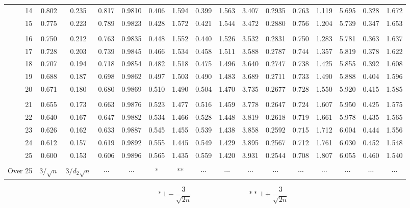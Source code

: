\documentclass{article}
\begin{document}
\begin{center}
\begin{tabular}{|r|c|c|c|c|c|c|c|c|c|c|c|c|c|c|c|}
    14 & 0.802 & 0.235 & 0.817 & 0.9810 & 0.406 & 1.594 & 0.399 & 1.563
       & 3.407 & 0.2935 & 0.763 & 1.119 & 5.695 & 0.328 & 1.672 \\
    15 & 0.775 & 0.223 & 0.789 & 0.9823 & 0.428 & 1.572 & 0.421 & 1.544
       & 3.472 & 0.2880 & 0.756 & 1.204 & 5.739 & 0.347 & 1.653 \\
       &       &        &       &       &       &       &       &
       &       &        &       &       &       &       &       \\
    16 & 0.750 & 0.212 & 0.763 & 0.9835 & 0.448 & 1.552 & 0.440 & 1.526
       & 3.532 & 0.2831 & 0.750 & 1.283 & 5.781 & 0.363 & 1.637 \\
    17 & 0.728 & 0.203 & 0.739 & 0.9845 & 0.466 & 1.534 & 0.458 & 1.511
       & 3.588 & 0.2787 & 0.744 & 1.357 & 5.819 & 0.378 & 1.622 \\
    18 & 0.707 & 0.194 & 0.718 & 0.9854 & 0.482 & 1.518 & 0.475 & 1.496
       & 3.640 & 0.2747 & 0.738 & 1.425 & 5.855 & 0.392 & 1.608 \\
    19 & 0.688 & 0.187 & 0.698 & 0.9862 & 0.497 & 1.503 & 0.490 & 1.483
       & 3.689 & 0.2711 & 0.733 & 1.490 & 5.888 & 0.404 & 1.596 \\
    20 & 0.671 & 0.180 & 0.680 & 0.9869 & 0.510 & 1.490 & 0.504 & 1.470
       & 3.735 & 0.2677 & 0.728 & 1.550 & 5.920 & 0.415 & 1.585 \\
       &       &        &       &       &       &       &       &
       &       &        &       &       &       &       &       \\
    21 & 0.655 & 0.173 & 0.663 & 0.9876 & 0.523 & 1.477 & 0.516 & 1.459
       & 3.778 & 0.2647 & 0.724 & 1.607 & 5.950 & 0.425 & 1.575 \\
    22 & 0.640 & 0.167 & 0.647 & 0.9882 & 0.534 & 1.466 & 0.528 & 1.448
       & 3.819 & 0.2618 & 0.719 & 1.661 & 5.978 & 0.435 & 1.565 \\
    23 & 0.626 & 0.162 & 0.633 & 0.9887 & 0.545 & 1.455 & 0.539 & 1.438
       & 3.858 & 0.2592 & 0.715 & 1.712 & 6.004 & 0.444 & 1.556 \\
    24 & 0.612 & 0.157 & 0.619 & 0.9892 & 0.555 & 1.445 & 0.549 & 1.429
       & 3.895 & 0.2567 & 0.712 & 1.761 & 6.030 & 0.452 & 1.548 \\
    25 & 0.600 & 0.153 & 0.606 & 0.9896 & 0.565 & 1.435 & 0.559 & 1.420
       & 3.931 & 0.2544 & 0.708 & 1.807 & 6.055 & 0.460 & 1.540 \\
       &       &        &       &       &       &       &       &
       &       &        &       &       &       &       &       \\
    Over 25 & $3/\sqrt{n}$ & $3/d_2\sqrt{n}$ & $\cdots$ & $\cdots$ & * & ** 
       & $\cdots$ & $\cdots$ & $\cdots$ & $\cdots$ & $\cdots$ & $\cdots$ 
       & $\cdots$ & $\cdots$ & $\cdots$ \\ \hline
  \end{tabular}
  \[ *\ 1-\frac{3}{\sqrt{2n}} \qquad\qquad\qquad\qquad
     \mathrm{**}\ 1+\frac{3}{\sqrt{2n}} \]
\end{center}
\end{document}
